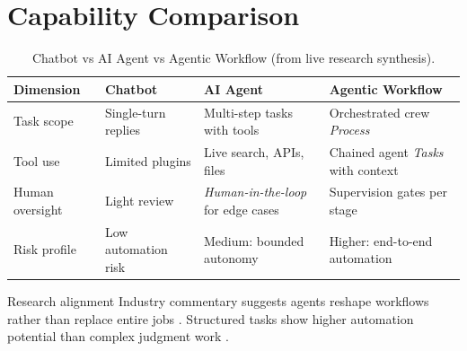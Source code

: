 
\section{Capability Comparison}
\label{sec:capability-table}

\begin{table}[htbp]
  \centering
  \caption{Chatbot vs AI Agent vs Agentic Workflow (from live research synthesis).}
  \label{tab:capability-comparison}
  \small
  \begin{tabularx}{\linewidth}{@{}lXXX@{}}
    \toprule
    \textbf{Dimension} & \textbf{Chatbot} & \textbf{AI Agent} & \textbf{Agentic Workflow} \\
    \midrule
    Task scope & Single-turn replies & Multi-step tasks with tools &
      Orchestrated crew \emph{Process} \\
    Tool use & Limited plugins & Live search, APIs, files &
      Chained agent \emph{Tasks} with context \\
    Human oversight & Light review & \emph{Human-in-the-loop} for edge cases &
      Supervision gates per stage \\
    Risk profile & Low automation risk & Medium: bounded autonomy &
      Higher: end-to-end automation \\
  \bottomrule
  \end{tabularx}
\end{table}

\begin{insightbox}{Research alignment}
Industry commentary suggests agents reshape workflows rather than replace entire jobs
\cite{mediumworkflowagents,recomaijobroles}. Structured tasks show higher automation
potential than complex judgment work \cite{redditcomplextasks}.
\end{insightbox}
